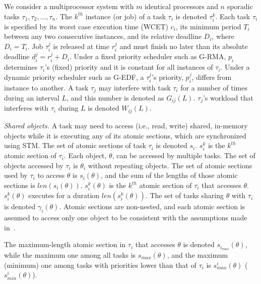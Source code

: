 \documentclass[conference]{IEEEtran}
\begin{document}
We consider a multiprocessor system with $m$ identical processors and $n$ sporadic tasks $\tau_1, \tau_2,\ldots, \tau_n$. The $k^{th}$ instance (or job) of a task $\tau_i$ is denoted $\tau_i^k$. Each task $\tau_i$ is specified by its worst case execution time (WCET) $c_i$, its minimum period $T_i$ between any two consecutive instances, and its relative deadline $D_i$, where $D_i=T_i$. Job $\tau_i^j$ is released at time $r_i^j$ and must finish no later than its absolute deadline $d_i^j=r_i^j+D_i$. Under a fixed priority scheduler such as G-RMA, $p_i$ determines $\tau_i$'s (fixed) priority and it is constant for all instances of $\tau_i$. Under a dynamic priority scheduler such as G-EDF, a $\tau_i^j$'s priority, $p_i^j$, differs from  instance to another. 
A task $\tau_j$ may interfere with task $\tau_i$ for a number of times during an interval $L$, and this number is denoted as $G_{ij}(L)$. 
$\tau_j$'s workload that interferes with $\tau_i$ during $L$ is denoted $W_{ij}(L)$.


\textit{Shared objects.} A task may need to access (i.e., read, write) shared, in-memory objects while it is executing any of its atomic sections, which are synchronized using STM. 
The set of atomic sections of task $\tau_i$ is denoted $s_i$. $s_i^k$ is the $k^{th}$ atomic section of $\tau_i$. 
Each object, $\theta$, can be accessed by multiple tasks. The set of objects accessed by $\tau_i$ is $\theta_i$ without repeating objects.
The set of atomic sections used by $\tau_i$ to access $\theta$ is $s_i(\theta)$, and the sum of the lengths of those atomic sections is $len(s_i(\theta))$. $s_i^k(\theta)$ is the $k^{th}$ atomic section of $\tau_i$ that accesses $\theta$. $s_i^k(\theta)$  executes for a duration $len(s_i^k(\theta))$.
The set of tasks sharing $\theta$ with $\tau_i$ is denoted $\gamma_i(\theta)$. Atomic sections are non-nested, and each atomic section is assumed to access only one object to be consistent with the assumptions made in~\cite{stmconcurrencycontrol:emsoft11}.%

The maximum-length atomic section in $\tau_i$ that accesses $\theta$ is denoted $s_{i_{max}} (\theta)$, while the maximum one among all tasks is $s_{max} (\theta)$, and the maximum (minimum) one among tasks with priorities lower than that of $\tau_i$ is $s_{max}^i (\theta)$ ($s_{min}^i (\theta)$).
\end{document}
